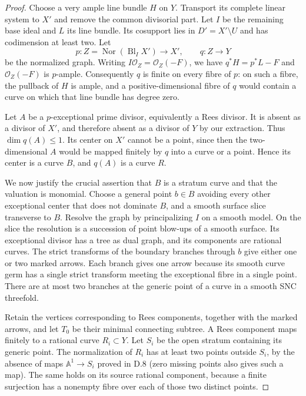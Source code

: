 \begin{proof}
Choose a very ample line bundle $H$ on $Y$. Transport its complete linear system to $X'$ and remove the common divisorial part. Let $I$ be the remaining base ideal and $L$ its line bundle. Its cosupport lies in $D'=X'\setminus U$ and has codimension at least two. Let
\[
 p:Z=\operatorname{Nor}(\operatorname{Bl}_I X')\longrightarrow X',
 \qquad q:Z\longrightarrow Y
\]
be the normalized graph. Writing $I\mathcal O_Z=\mathcal O_Z(-F)$, we have $q^*H=p^*L-F$ and $\mathcal O_Z(-F)$ is $p$-ample. Consequently $q$ is finite on every fibre of $p$: on such a fibre, the pullback of $H$ is ample, and a positive-dimensional fibre of $q$ would contain a curve on which that line bundle has degree zero.

Let $A$ be a $p$-exceptional prime divisor, equivalently a Rees divisor. It is absent as a divisor of $X'$, and therefore absent as a divisor of $Y$ by our extraction. Thus $\dim q(A)\leq1$. Its center on $X'$ cannot be a point, since then the two-dimensional $A$ would be mapped finitely by $q$ into a curve or a point. Hence its center is a curve $B$, and $q(A)$ is a curve $R$.

We now justify the crucial assertion that $B$ is a stratum curve and that the valuation is monomial. Choose a general point $b\in B$ avoiding every other exceptional center that does not dominate $B$, and a smooth surface slice transverse to $B$. Resolve the graph by principalizing $I$ on a smooth model. On the slice the resolution is a succession of point blow-ups of a smooth surface. Its exceptional divisor has a tree as dual graph, and its components are rational curves. The strict transforms of the boundary branches through $b$ give either one or two marked arrows. Each branch gives one arrow because its smooth curve germ has a single strict transform meeting the exceptional fibre in a single point. There are at most two branches at the generic point of a curve in a smooth SNC threefold.

Retain the vertices corresponding to Rees components, together with the marked arrows, and let $T_0$ be their minimal connecting subtree. A Rees component maps finitely to a rational curve $R_i\subset Y$. Let $S_i$ be the open stratum containing its generic point. The normalization of $R_i$ has at least two points outside $S_i$, by the absence of maps $\mathbb A^1\to S_i$ proved in D.8 (zero missing points also gives such a map). The same holds on its source rational component, because a finite surjection has a nonempty fibre over each of those two distinct points.


\end{proof}
